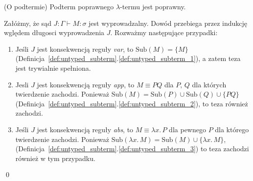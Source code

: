 \begin{lemat}(O podtermie)
  Podterm poprawnego \(\lambda\)-termu jest poprawny.
\end{lemat}
\begin{dowod}
  Załóżmy, że sąd \(J: \Gamma\vdash M:\sigma\) jest wyprowadzalny. Dowód przebiega przez indukcję wględem długosci wyprowadzenia \(J\). Rozważmy następujące przypadki:
  \begin{enumerate}[label=(\alph*)]
    \setlength\itemsep{0em}
    \item Jeśli \(J\) jest konsekwencją reguły \emph{var}, to \(\mathrm{Sub}(M)=\{M\}\) (Definicja~\ref{def:untyped_subterm}.\ref{def:untyped_subterm_1}), a zatem teza jest trywialnie spełniona.
     \item Jesli \(J\) jest konsekwencją reguły \emph{app}, to \(M\equiv PQ\) dla \(P,\,Q\) dla których twierdzenie zachodzi. Ponieważ \(\mathrm{Sub}(M)=\mathrm{Sub}(P)\cup\mathrm{Sub}(Q)\cup\{PQ\}\) (Definicja~\ref{def:untyped_subterm}.\ref{def:untyped_subterm_2}), to teza również zachodzi.
    \item Jeśli \(J\) jest konsekwencją reguły \emph{abs}, to \(M\equiv \lambda
      x.\,P\) dla pewnego \(P\) dla którego twierdzenie zachodzi. Ponieważ
      \(\mathrm{Sub}(\lambda x.\,M) = \mathrm{Sub}(M) \cup \{\lambda x.\,M\}\),
      (Definicja~\ref{def:untyped_subterm}.\ref{def:untyped_subterm_3})
      to teza zachodzi również w tym przypadku.
  \end{enumerate}
  \qed
\end{dowod}

